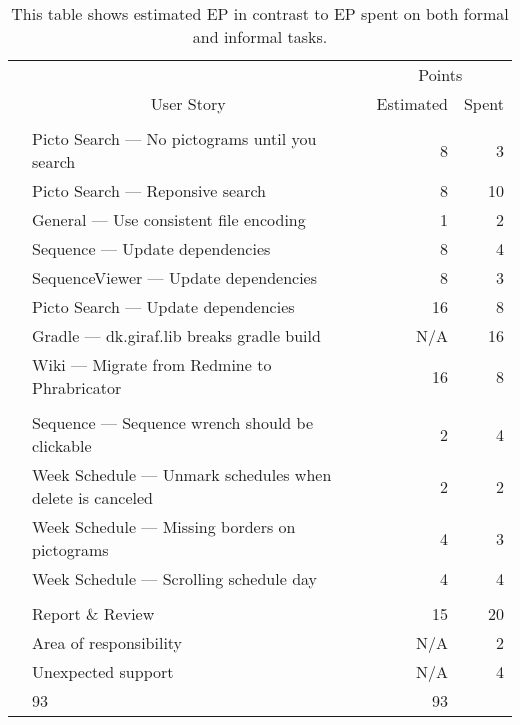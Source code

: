 \begin{table}[!htbp]
\small
\centering
    \begin{tabular}{llrr}
        && \multicolumn{2}{c}{Points}                                                          \\
        \cline{3-4}
        \multicolumn{2}{c}{User Story}		                         & Estimated & Spent \\
        \midrule
        \tblgrpsep
        \multicolumn{2}{l}{Formal tasks}							                     \\
        \cline{1-2}
        &Picto Search --- No pictograms until you search             & 8          & 3    \\
        &Picto Search --- Reponsive search                           & 8          & 10   \\
        &General --- Use consistent file encoding                    & 1          & 2    \\
        &Sequence --- Update dependencies                            & 8          & 4    \\
        &SequenceViewer --- Update dependencies                      & 8          & 3    \\
        &Picto Search --- Update dependencies                        & 16         & 8    \\
        &Gradle --- dk.giraf.lib breaks gradle build                 & N/A        & 16   \\
        &Wiki --- Migrate from Redmine to Phrabricator               & 16         & 8    \\
        \tblgrpsep
        \multicolumn{2}{l}{Extra tasks}									                 \\
        \cline{1-2}
        &Sequence --- Sequence wrench should be clickable            & 2          & 4    \\
        &Week Schedule --- Unmark schedules when delete is canceled  & 2          & 2    \\
        &Week Schedule --- Missing borders on pictograms             & 4          & 3    \\
        &Week Schedule --- Scrolling schedule day                    & 4          & 4    \\
        \tblgrpsep
        \multicolumn{2}{l}{Informal tasks}									             \\
        \cline{1-2}
        &Report \& Review                                            & 15         & 20   \\
        &Area of responsibility                                      & N/A        & 2    \\
        &Unexpected support                                          & N/A        & 4    \\
        \tblgrpsep
        \midrule
        \multicolumn{2}{l}{Total}                                    & 93         & 93   \\
    \end{tabular}
    \caption{This table shows estimated EP in contrast to EP spent on both formal and informal tasks.}\label{tab:sprint1tasktable}
\end{table}
